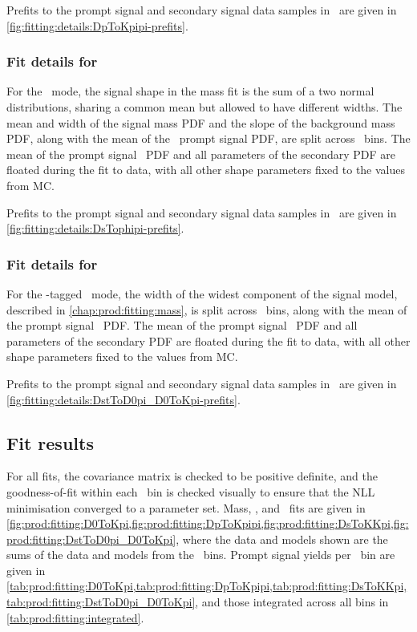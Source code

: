 Prefits to the prompt signal and secondary signal data samples in \lnipchisq\ 
are given in \cref{fig:fitting:details:DpToKpipi-prefits}.

\subsubsection*{Fit details for \PDsplus}
\label{chap:prod:fitting:details:DsToKKpi}

For the \DspTophipi\ mode, the signal shape in the mass fit is the sum of a two 
normal distributions, sharing a common mean but allowed to have different 
widths.
The mean and width of the signal mass \ac{PDF} and the slope of the background 
mass \ac{PDF}, along with the mean of the \lnipchisq\ prompt signal \ac{PDF}, 
are split across \pTy\ bins.
The mean of the prompt signal \lnipchisq\ \ac{PDF} and all parameters of the 
secondary \ac{PDF} are floated during the fit to data, with all other shape 
parameters fixed to the values from \ac{MC}.

Prefits to the prompt signal and secondary signal data samples in \lnipchisq\ 
are given in \cref{fig:fitting:details:DsTophipi-prefits}.

\subsubsection*{Fit details for \PDstarp}
\label{chap:prod:fitting:details:DstToD0pi}

For the \PDstarp-tagged \DzToKpi\ mode, the width of the widest component of 
the signal model, described in \cref{chap:prod:fitting:mass}, is split across 
\pTy\ bins, along with the mean of the prompt signal \lnipchisq\ \ac{PDF}.
The mean of the prompt signal \lnipchisq\ \ac{PDF} and all parameters of the 
secondary \ac{PDF} are floated during the fit to data, with all other shape 
parameters fixed to the values from \ac{MC}.

Prefits to the prompt signal and secondary signal data samples in \PDzero 
\lnipchisq\ are given in \cref{fig:fitting:details:DstToD0pi_D0ToKpi-prefits}.

\subsection{Fit results}
\label{chap:prod:fitting:results}

For all fits, the covariance matrix is checked to be positive definite, and the 
goodness-of-fit within each \pTy\ bin is checked visually to ensure that the 
\ac{NLL} minimisation converged to a parameter set.
Mass, \deltam, and \lnipchisq\ fits are given in 
\cref{fig:prod:fitting:D0ToKpi,fig:prod:fitting:DpToKpipi,fig:prod:fitting:DsToKKpi,fig:prod:fitting:DstToD0pi_D0ToKpi}, 
where the data and models shown are the sums of the data and models from the 
\pTy\ bins.
Prompt signal yields per \pTy\ bin are given in 
\cref{tab:prod:fitting:D0ToKpi,tab:prod:fitting:DpToKpipi,tab:prod:fitting:DsToKKpi,tab:prod:fitting:DstToD0pi_D0ToKpi}, 
and those integrated across all bins in \cref{tab:prod:fitting:integrated}.


